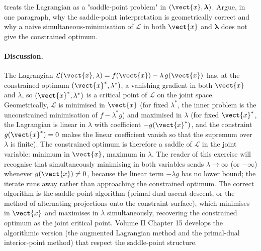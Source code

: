 \begin{exercise}
\textcite{text:strang2016} treats the Lagrangian as a "saddle-point
problem" in $(\vect{x}, \boldsymbol{\lambda})$. Argue, in one
paragraph, why the saddle-point interpretation is geometrically
correct and why a naive simultaneous-minimisation of $\mathcal{L}$
in both $\vect{x}$ and $\boldsymbol{\lambda}$ does not give the
constrained optimum.

\paragraph{Discussion.} The Lagrangian $\mathcal{L}(\vect{x},
\lambda) = f(\vect{x}) - \lambda\,g(\vect{x})$ has, at the
constrained optimum $(\vect{x}^{*}, \lambda^{*})$, a vanishing
gradient in both $\vect{x}$ and $\lambda$, so $(\vect{x}^{*},
\lambda^{*})$ is a critical point of $\mathcal{L}$ on the joint
space. Geometrically, $\mathcal{L}$ is minimised in $\vect{x}$
(for fixed $\lambda^{*}$, the inner problem is the unconstrained
minimisation of $f - \lambda^{*} g$) and maximised in $\lambda$
(for fixed $\vect{x}^{*}$, the Lagrangian is linear in $\lambda$
with coefficient $-g(\vect{x}^{*})$, and the constraint
$g(\vect{x}^{*}) = 0$ makes the linear coefficient vanish so that
the supremum over $\lambda$ is finite). The constrained optimum is
therefore a saddle of $\mathcal{L}$ in the joint variable: minimum
in $\vect{x}$, maximum in $\lambda$. The reader of this exercise
will recognise that simultaneously minimising in both variables
sends $\lambda \to \infty$ (or $-\infty$) whenever $g(\vect{x})
\neq 0$, because the linear term $-\lambda g$ has no lower bound;
the iterate runs away rather than approaching the constrained
optimum. The correct algorithm is the saddle-point algorithm
(primal-dual ascent-descent, or the method of alternating
projections onto the constraint surface), which minimises in
$\vect{x}$ and maximises in $\lambda$ simultaneously, recovering
the constrained optimum as the joint critical point. Volume II
Chapter 15 develops the algorithmic version (the augmented
Lagrangian method and the primal-dual interior-point method) that
respect the saddle-point structure.
\end{exercise}

